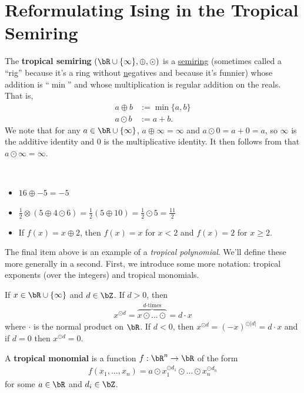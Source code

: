 \section{Reformulating Ising in the Tropical Semiring}
\begin{defn}\label{defn:tropical-semiring}
	The \textbf{tropical semiring} $(\bR \cup \{\infty\},\oplus,\odot)$ is a \href{https://en.wikipedia.org/wiki/Semiring}{\underline{semiring}} (sometimes called a ``rig'' because it's a ring without \underline{n}egatives and because it's funnier) whose addition is ``$\min$'' and whose multiplication is regular addition on the reals. That is,
	\begin{align*}
		a \oplus b &:= \min\{a,b\} \\
		a\odot b &:= a + b.
	\end{align*}
	We note that for any $a \in \bR\cup \{\infty\}$, $a\oplus \infty = \infty$ and $a\odot 0 = a + 0 = a$, so $\infty$ is the additive identity and $0$ is the multiplicative identity. It then follows from that $a\odot \infty = \infty$.
\end{defn}
\begin{example}\label{example:some-tropical-operations}$ $
	\begin{itemize}
		\item $16 \oplus -5 = -5$
		\item $\frac{1}{2} \otimes (5 \oplus 4 \odot 6) = \frac{1}{2}(5 \oplus 10) = \frac{1}{2} \odot 5 = \frac{11}{2}$
		\item If $f(x) = x \oplus 2$, then $f(x) = x$ for $x < 2$ and $f(x) = 2$ for $x \geq 2$.
	\end{itemize}
\end{example}
The final item above is an example of a \emph{tropical polynomial}. We'll define these more generally in a second. First, we introduce some more notation: tropical exponents (over the integers) and tropical monomials.
\begin{defn}\label{defn:tropical-monomials}
	If $x \in \bR\cup \{\infty\}$ and $d \in \bZ$. If $d > 0$, then
	\begin{align*}
		x^{\odot d} = \overbrace{x\odot...\odot}^{\text{$d$-times}} = d\cdot x
	\end{align*}
	where $\cdot$ is the normal product on $\bR$. If $d< 0$, then $x^{\odot d} = (-x)^{\odot |d|} = d\cdot x$ and if $d = 0$ then $x^{\odot d} = 0$.

	A \textbf{tropical monomial} is a function $f:\bR^n\to \bR$ of the form 
	\begin{align*}
		f(x_1,...,x_n) = a\odot x_1^{\odot d_1}\odot...\odot x_n^{\odot d_n}
	\end{align*}
	for some $a \in \bR$ and $d_i \in \bZ$.	
\end{defn}

